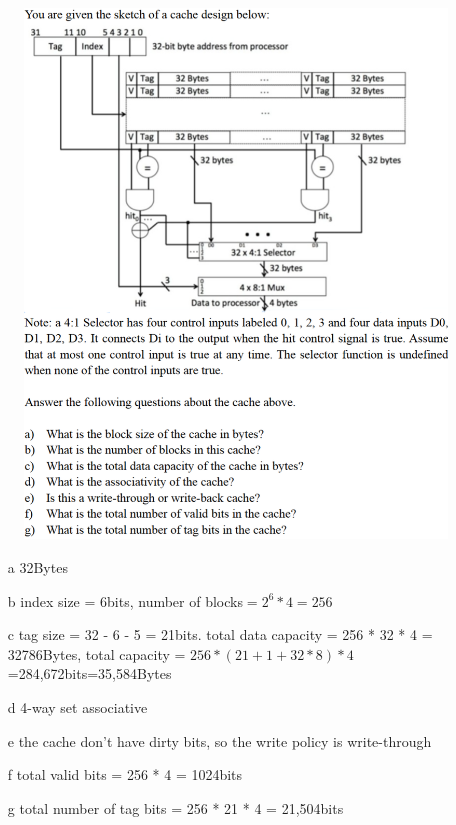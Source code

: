 \documentclass[cn,12pt]{homework}
\begin{document}
\newpage
\begin{problem}
  \quad
  \begin{figure}[H]
    \centering
    \includegraphics[width=1\textwidth]{./figures/image6.png}
    \label{fig:pro1}
  \end{figure}

\end{problem}
\newpage
\begin{solution} \quad


  \begin{enumerate}
    \item[a] 32Bytes
    \item[b] index size = 6bits, number of blocks$ = 2^6 * 4 = 256$
    \item[c] tag size = 32 - 6 - 5 = 21bits. total data capacity = 256 * 32 * 4 = 32786Bytes,
     total capacity = $256 * (21+1+32*8)*4$=284,672bits=35,584Bytes
    \item[d] 4-way set associative
    \item[e] the cache don't have dirty bits, so the write policy is write-through
    \item[f] total valid bits = 256 * 4 = 1024bits
    \item[g] total number of tag bits = 256 * 21 * 4 = 21,504bits
  \end{enumerate}

\end{solution}
\end{document}
